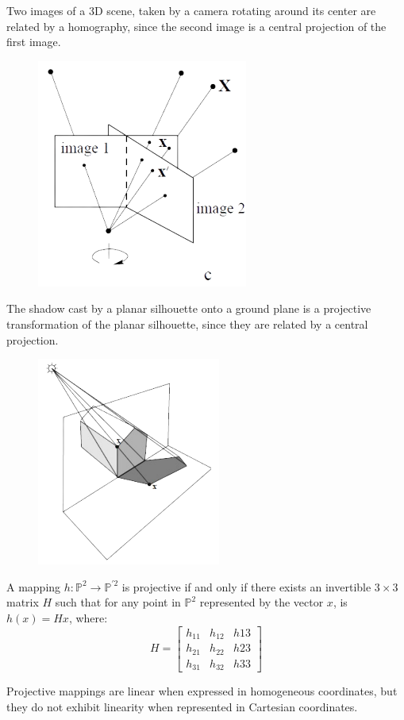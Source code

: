 \begin{example}
\begin{figure}[H]
    \end{figure}
    Two images of a 3D scene, taken by a camera rotating around its center are related by a homography, since the second image is a central projection of the first image. 
    \begin{figure}[H]
        \centering
        \includegraphics[width=0.3\linewidth]{images/map4.png}
    \end{figure}
    The shadow cast by a planar silhouette onto a ground plane is a projective transformation of the planar silhouette, since they are related by a central projection. 
    \begin{figure}[H]
        \centering
        \includegraphics[width=0.3\linewidth]{images/map5.png}
    \end{figure}
\end{example}
\begin{theorem}
    A mapping $h:\mathbb{P}^{2} \rightarrow \mathbb{P}^{'2}$ is projective if and only if there exists an invertible $3 \times 3$ matrix $H$ such that for any point in $\mathbb{P}^{2}$ represented by the vector $x$, is $h(x)=Hx$, where: 
    \[H=\begin{bmatrix}
        h_{11} & h_{12} & h{13} \\
        h_{21} & h_{22} & h{23} \\
        h_{31} & h_{32} & h{33} 
    \end{bmatrix}\]
\end{theorem}
Projective mappings are linear when expressed in homogeneous coordinates, but they do not exhibit linearity when represented in Cartesian coordinates.

